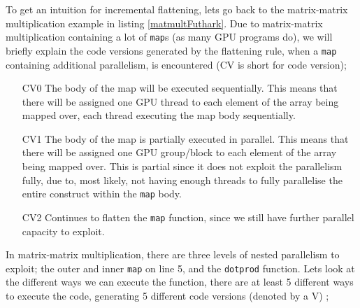 To get an intuition for incremental flattening, lets go back to the matrix-matrix multiplication example in listing \ref{matmultFuthark}. Due to matrix-matrix multiplication containing a lot of \texttt{map}s (as many GPU programs do), we will briefly explain the code versions generated by the flattening rule, when a \texttt{map} containing additional parallelism, is encountered (CV is short for code version); 
\begin{itemize}
\item[CV0] The body of the map will be executed sequentially. This means that there will be assigned one GPU thread to each element of the array being mapped over, each thread executing the map body sequentially.
\item[CV1] The body of the map is partially executed in parallel. This means that there will be assigned one GPU group/block to each element of the array being mapped over. This is partial since it does not exploit the parallelism fully, due to, most likely, not having enough threads to fully parallelise the entire construct within the \texttt{map} body.
\item[CV2] Continues to flatten the \texttt{map} function, since we still have further parallel capacity to exploit.  
\end{itemize}
\begin{center}
	\centering 
	
	\label{maptree}
\end{center}
In matrix-matrix multiplication, there are three levels of nested parallelism to exploit; the outer and inner \texttt{map} on line 5, and the \texttt{dotprod} function. Lets look at the different ways we can execute the function, there are at least 5 different ways to execute the code, generating 5 different code versions (denoted by a V) \cite{inc-flat};
